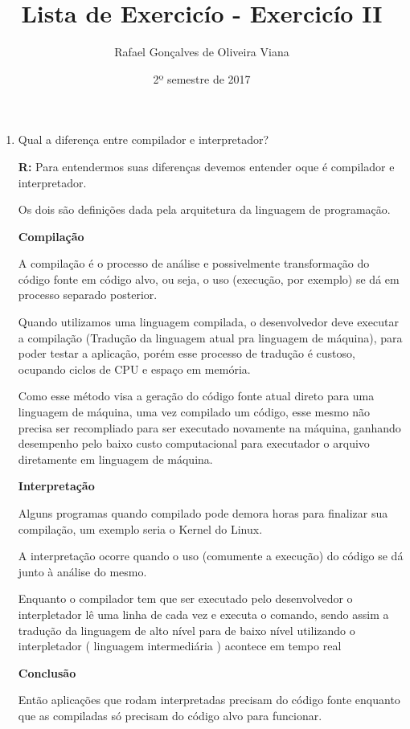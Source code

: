 \documentclass[12pt]{article}
\title{Lista de Exercicío  - Exercicío II }
\author{Rafael Gonçalves de  Oliveira Viana}
\date{2º semestre de 2017}
\begin{document}
\maketitle

\begin{enumerate}
\item
Qual a diferença entre compilador e interpretador?

\textbf{R:}	
Para entendermos suas diferenças devemos entender oque é compilador e interpretador.
 
Os dois são definições dada pela arquitetura da linguagem de programação.

\textbf{Compilação}

A compilação é o processo de análise e possivelmente transformação do código fonte em código alvo, ou seja, o uso (execução, por exemplo) se dá em processo separado posterior.

Quando utilizamos uma linguagem compilada, o desenvolvedor deve executar a compilação (Tradução da linguagem atual pra linguagem de máquina), para poder testar a aplicação, porém esse processo de tradução é custoso, ocupando ciclos de CPU e espaço em memória.

Como esse método visa a geração do código fonte atual direto para uma linguagem de máquina, uma vez compilado um código, esse mesmo não precisa ser recompliado para ser executado novamente na máquina, ganhando desempenho pelo baixo custo computacional para executador o arquivo diretamente em linguagem de máquina.

\textbf{Interpretação}

Alguns programas quando compilado pode demora horas para finalizar sua compilação, um exemplo seria o Kernel do Linux. 

A interpretação ocorre quando o uso (comumente a execução) do código se dá junto à análise do mesmo.

Enquanto o compilador tem que ser executado pelo desenvolvedor o interpletador lê uma linha de cada vez e executa o comando, sendo assim a tradução da linguagem de alto nível para de baixo nível utilizando o interpletador ( linguagem intermediária ) acontece em tempo real

\textbf{Conclusão}

Então aplicações que rodam interpretadas precisam do código fonte enquanto que as compiladas só precisam do código alvo para funcionar.

 
 
\end{enumerate}
\end{document}
